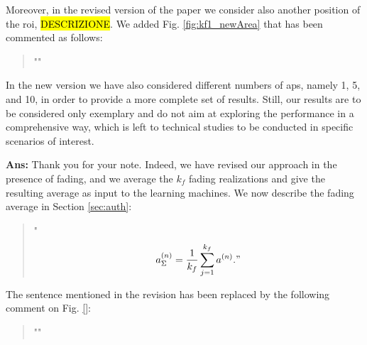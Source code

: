 \documentclass[draftcls,onecolumn,12pt]{IEEEtran}
\newcounter{revc}
\newcommand{\revp}[1]{\zref[revcontent]{#1}}
\begin{document}
{Moreover, in the revised version of the paper we consider also another position of the \ac{roi}, \hl{DESCRIZIONE}. We added Fig. \ref{fig:kf1_newArea} that has been commented as follows:
\begin{quote}
"\revp{revnewarea}"
\end{quote}

In the new version we have also considered different numbers of \acp{ap}, namely 1, 5, and 10, in order to provide a more complete set of results. Still, our results are to be considered only exemplary and do not aim at exploring the performance in a comprehensive way, which is left to technical studies to be conducted in specific scenarios of interest.

\vspace{5mm} %
\begin{framed}
\end{framed}

{\bf Ans:} Thank you for your note. Indeed, we have revised our approach in the presence of fading, and we average the $k_f$ fading realizations and give the resulting average as input to the learning machines. We now describe the fading average in Section \ref{sec:auth}:
\begin{quote}
    "\revp{avg_1}
$$
a^{(n)}_{\Sigma} = \frac{1}{k_f}\sum_{j=1}^{k_f} a^{(n)}."
$$
\end{quote}

The sentence mentioned in the revision has been replaced by the following comment on Fig. \ref{}:
\begin{quote}
    "\revp{rev2fad}"
\end{quote}

\vspace{5mm} %
\begin{framed}
\end{framed}

}
\end{document}
